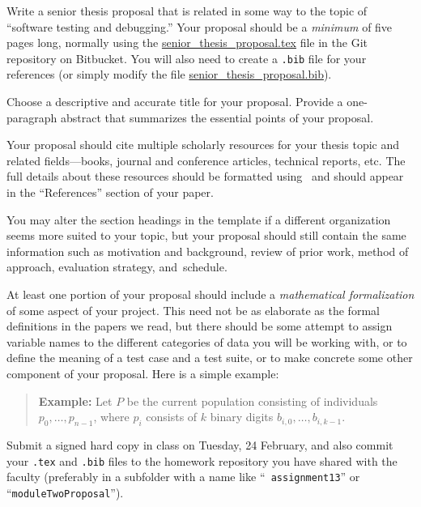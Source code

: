 

\usepackage{ulem}
\usepackage[compact]{titlesec}




Write a senior thesis proposal that is related in some way to the topic of ``software testing and debugging.'' Your
proposal should be a {\em minimum} of five pages long, normally using the \url{senior_thesis_proposal.tex} file in the
Git repository on Bitbucket.  You will also need to create a {\tt .bib} file for your references (or simply modify the
file \url{senior_thesis_proposal.bib}).

Choose a descriptive and accurate title for your proposal. Provide a one-paragraph abstract that summarizes the
essential points of your proposal.

Your proposal should cite multiple scholarly resources for your thesis topic and related fields---books, journal and
conference articles, technical reports, etc. The full details about these resources should be formatted using \BibTeX\
and should appear in the ``References'' section of your paper.

You may alter the section headings in the template if a different organization seems more suited to your topic, but your
proposal should still contain the same information such as motivation and background, review of prior work,
method of approach, evaluation strategy, \mbox{and schedule}.

At least one portion of your proposal should include a {\em mathematical formalization} of some aspect of your project.
This need not be as elaborate as the formal definitions in the papers we read, but there should be some attempt to
assign variable names to the different categories of data you will be working with, or to define the meaning of a test
case and a test suite, or to make concrete some other component of your proposal. Here is a simple example:

\begin{quote}
{\bf Example:} Let $P$ be the current population consisting of individuals
$p_0, \ldots, p_{n-1}$, where $p_i$ consists of $k$ binary digits
$b_{i,0}, \ldots, b_{i,k-1}$.
\end{quote}

Submit a signed hard copy in class on Tuesday, 24 February, and also commit your {\tt .tex} and {\tt .bib} files to the
homework repository you have shared with the faculty (preferably in a subfolder with a name like ``{\tt
assignment13}'' or ``{\tt moduleTwoProposal}'').  
